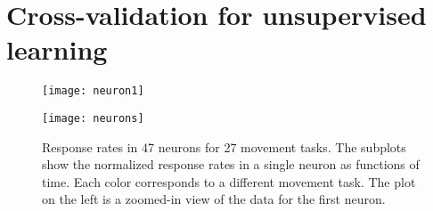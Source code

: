 
\chapter{Cross-validation for unsupervised learning}


\begin{figure}[tbh]
    \centering
    \begin{minipage}{0.38\textwidth}
        \begin{center}
            \texttt{[image: neuron1]}
        \end{center}
    \end{minipage}
    \begin{minipage}{0.61\textwidth}
        \begin{center}
            \texttt{[image: neurons]}
        \end{center}
    \end{minipage}
    \caption{
        Response rates in 47 neurons for 27 movement tasks.  The subplots show
        the normalized response rates in a single neuron as functions of time.  
        Each color corresponds to a different movement task.  The plot on
        the left is a zoomed-in view of the data for the first neuron.
    }
\end{figure}
